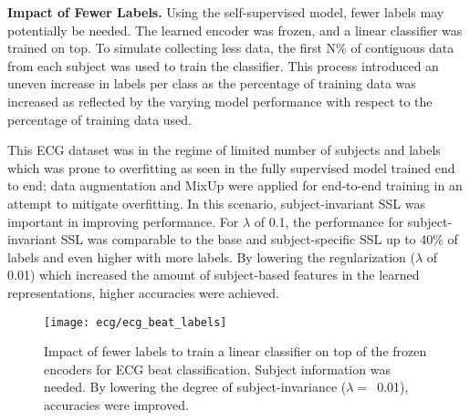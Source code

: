 \documentclass{article}
\renewcommand{\paragraph}[1]{\textbf{#1}\hspace{1em}}
\begin{document}
\paragraph{Impact of Fewer Labels.} Using the self-supervised model, fewer
labels may potentially be needed. The learned encoder was frozen, and a linear
classifier was trained on top. To simulate collecting less data, the first N\%
of contiguous data from each subject was used to train the classifier. This
process introduced an uneven increase in labels per class as the percentage of
training data was increased as reflected by the varying model performance with
respect to the percentage of training data used.

This ECG dataset was in the regime of limited number of subjects and labels
which was prone to overfitting as seen in the fully supervised model trained end
to end; data augmentation and MixUp \cite{zhang_mixup_2018} were applied for
end-to-end training in an attempt to mitigate overfitting. In this scenario,
subject-invariant SSL was important in improving performance. For $\lambda$ of
0.1, the performance for subject-invariant SSL was comparable to the base and
subject-specific SSL up to 40\% of labels and even higher with more labels. By
lowering the regularization ($\lambda$ of 0.01) which increased the amount of
subject-based features in the learned representations, higher accuracies were
achieved.

\begin{figure}
  \centering
  \begin{minipage}[c]{0.68\textwidth}
    \texttt{[image: ecg/ecg\_beat\_labels]}
  \end{minipage}\hfill
  \begin{minipage}[c]{0.32\textwidth}
    \caption{Impact of fewer labels to train a linear classifier on top of the
    frozen encoders for ECG beat classification. Subject information was needed.
    By lowering the degree of subject-invariance ($\lambda=$~0.01), accuracies
    were improved.}
    \label{fig:ecg:labels}
  \end{minipage}
\end{figure}
\end{document}

